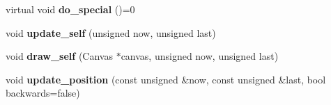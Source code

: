 \begin{DoxyCompactItemize}
\mbox{\label{classCharacter_a447eb9fa4afa57619d6387e0ea178f93}} 
virtual void {\bfseries do\+\_\+special} ()=0
\item 
\mbox{\label{classCharacter_a94242f85f3afb3f12dd92e02797345bd}} 
void {\bfseries update\+\_\+self} (unsigned now, unsigned last)
\item 
\mbox{\label{classCharacter_a80d2f8164974c6a5b8a3c144508ec4a1}} 
void {\bfseries draw\+\_\+self} (Canvas $\ast$canvas, unsigned now, unsigned last)
\item 
\mbox{\label{classCharacter_a990779ce4c7baf305b9f04ba831a1f0f}} 
void {\bfseries update\+\_\+position} (const unsigned \&now, const unsigned \&last, bool backwards=false)
\end{DoxyCompactItemize}
